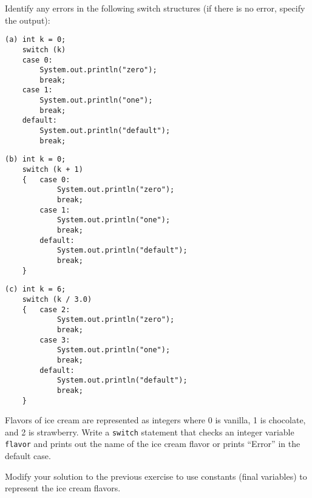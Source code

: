 \newpage
{}
\label{self-study-exercises}
\begin{SSTUDY}
\item  Identify any errors in the
following switch structures (if
there is no error, specify the output):

\begin{jjjlisting}
\begin{lstlisting}
(a) int k = 0;
    switch (k)
    case 0:
        System.out.println("zero");
        break;
    case 1:
        System.out.println("one");
        break;
    default:
        System.out.println("default");
        break;
\end{lstlisting}
\end{jjjlisting}

\begin{jjjlisting}
\begin{lstlisting}
(b) int k = 0;
    switch (k + 1)
    {   case 0:
            System.out.println("zero");
            break;
        case 1:
            System.out.println("one");
            break;
        default:
            System.out.println("default");
            break;
    }
\end{lstlisting}
\end{jjjlisting}
\begin{jjjlisting}
\begin{lstlisting}
(c) int k = 6;
    switch (k / 3.0)
    {   case 2:
            System.out.println("zero");
            break;
        case 3:
            System.out.println("one");
            break;
        default:
            System.out.println("default");
            break;
    }
\end{lstlisting}
\end{jjjlisting}

\item  Flavors of ice cream are represented as integers where 0 is
vanilla, 1 is chocolate, and 2 is strawberry.  Write a {\tt switch}
statement that checks an integer variable {\tt flavor} and prints
out the name of the ice cream flavor or prints ``Error'' in the
default case.

\item  Modify your solution to the previous exercise to use
constants (final variables) to represent the ice cream flavors.
\end{SSTUDY}


